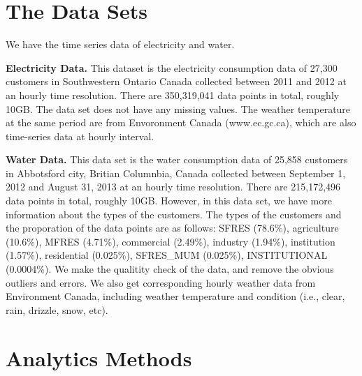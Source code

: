 \documentclass{sig-alternate}
\newcommand{\ie}{i.e.}
\begin{document}
\section{The Data Sets}
We have the time series data of electricity and water. 

{\bf Electricity Data.}
This dataset is the electricity consumption data of 27,300 customers in Southwestern Ontario Canada collected between 2011 and 2012 at an hourly time resolution. There are 350,319,041 data points in total, roughly 10GB. The data set does not have any missing values. The weather temperature at the same period are from Envoronment Canada (www.ec.gc.ca), which are also time-series data at hourly interval. 

{\bf Water Data.}
This data set is the water consumption data of 25,858 customers in Abbotsford city, Britian Columnbia, Canada collected between September 1, 2012 and August 31, 2013 at an hourly time resolution. There are 215,172,496 data points in total, roughly 10GB. However, in this data set, we have more information about the types of the customers. The types of the customers and the proporation of the data points are as follows:  SFRES (78.6\%), agriculture (10.6\%), MFRES (4.71\%), commercial (2.49\%),  industry (1.94\%), institution (1.57\%), residential (0.025\%),  SFRES\_MUM (0.025\%), INSTITUTIONAL (0.0004\%). We make the qualitity check of the data, and remove the obvious outliers and errors. We also get corresponding hourly weather data  from Environment Canada, including weather temperature and condition (\ie, clear, rain, drizzle, snow, etc).

\section{Analytics Methods}
\end{document}
